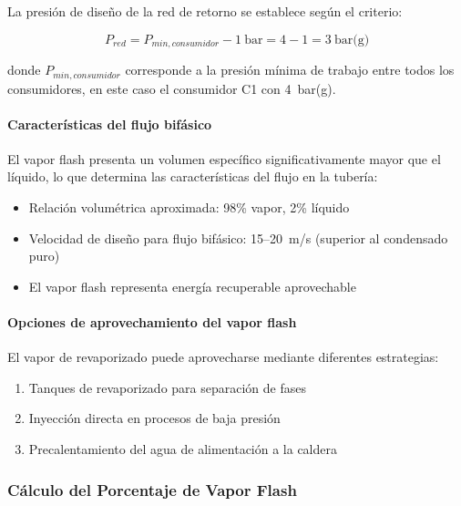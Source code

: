 \documentclass[12pt]{article}
\begin{document}
La presión de diseño de la red de retorno se establece según el criterio:

\begin{equation}
	P_{red} = P_{min,consumidor} - 1~\text{bar} = 4 - 1 = 3~\text{bar(g)}
	\label{eq:presion-red-condensados}
\end{equation}

donde $P_{min,consumidor}$ corresponde a la presión mínima de trabajo entre todos los consumidores, en este caso el consumidor C1 con 4~bar(g).

\paragraph{Características del flujo bifásico}

El vapor flash presenta un volumen específico significativamente mayor que el líquido, lo que determina las características del flujo en la tubería:

\begin{itemize}[noitemsep]
	\item Relación volumétrica aproximada: 98\% vapor, 2\% líquido
	\item Velocidad de diseño para flujo bifásico: 15--20~m/s (superior al condensado puro)
	\item El vapor flash representa energía recuperable aprovechable
\end{itemize}

\paragraph{Opciones de aprovechamiento del vapor flash}

El vapor de revaporizado puede aprovecharse mediante diferentes estrategias:

\begin{enumerate}[noitemsep]
	\item Tanques de revaporizado para separación de fases
	\item Inyección directa en procesos de baja presión
	\item Precalentamiento del agua de alimentación a la caldera
\end{enumerate}

\subsubsection{Cálculo del Porcentaje de Vapor Flash}
\label{subsubsec:calculo-vapor-flash}
\end{document}
